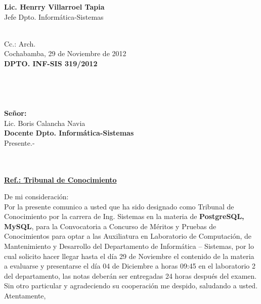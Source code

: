 \documentclass[letterpaper,11pt]{letter}
\begin{document}
\vspace{3.5cm}
\begin{center}
\begin{minipage}[b]{0.5\textwidth}
\begin{center}
{\bf Lic. Henrry Villarroel Tapia}\\
Jefe Dpto. Informática-Sistemas\\
\end{center}
\end{minipage}
\end{center}
~\\
Cc.: Arch.\\
\newpage
Cochabamba, 29 de Noviembre de 2012~\\
 \textbf{DPTO. INF-SIS 319/2012}\\
~\\
~\\
~\\
~\\
 \textbf{Señor:}~\\
Lic. Boris Calancha Navia~\\
 \textbf{Docente Dpto. Informática-Sistemas}~\\
Presente.-\\
~\\
~\\
\begin{center}
\underline{ \textbf{Ref.: Tribunal de Conocimiento}}
\end{center}
De mi consideración:\\
Por la presente comunico a usted que ha sido designado como Tribunal de Conocimiento por la carrera de Ing. Sistemas en la materia de \textbf{PostgreSQL, MySQL}, para la Convocatoria a Concurso de Méritos y Pruebas de Conocimientos para optar a las Auxiliatura en Laboratorio de Computación, de Mantenimiento y Desarrollo del Departamento de Informática – Sistemas, por lo cual solicito hacer llegar hasta el día 29 de Noviembre el contenido de la materia a evaluarse y presentarse el día 04 de Diciembre a horas 09:45 en el laboratorio 2 del departamento, las notas deberán ser entregadas 24 horas después del examen.\\
Sin otro particular y agradeciendo su cooperación me despido, saludando a usted.\\
Atentamente,\\
\end{document}
